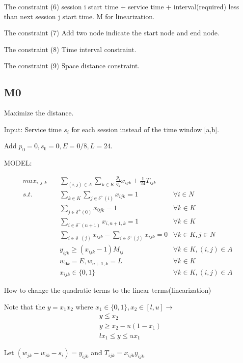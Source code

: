 The constraint (6) session i start time + service time + interval(required) less than next session j start time. M for linearization.


The constraint (7) Add two node indicate the start node and end node.

The constraint (8) Time interval constraint.

The constraint (9) Space distance constraint.


\subsection{M0}
Maximize the distance.

Input: Service time $s_i$ for each session instead of the time window [a,b].

Add $p_0 = 0, s_0 = 0, E = 0/8, L=24.$

MODEL:


\begin{align}
max_{i,j,k} \quad & \sum_{(i,j) \in A} \sum_{k \in K} \frac{p_i}{q_k} x_{ijk} + \frac{1}{24} T_{ijk} \\
s.t. \quad  & \sum_{k \in K} \sum_{j \in \delta^+ (i)} x_{ijk} =1 & \forall i \in N  \\
& \sum_{j \in \delta^+ (0)} x_{0jk} =1 & \forall k \in K \\
& \sum_{i \in \delta^- (n+1)} x_{i,n+1,k} =1 & \forall k \in K \\
& \sum_{i \in \delta^- (j)} x_{ijk} - \sum_{i \in \delta^+ (j)} x_{ijk} = 0  & \forall k \in K, j \in N \\
& y_{ijk} \geq (x_{ijk}-1) M_{ij} & \forall k \in K, (i,j) \in A \\
& w_{0k}=E, w_{n+1,k}=L  & \forall k \in K \\
& x_{ijk} \in \{0,1\} & \forall k \in K, (i,j) \in A
\end{align}

How to change the quadratic terms to the linear terms(linearization)

Note that the
$y =x_1 x_2$  where $x_1 \in \{0,1\}, x_2 \in [l,u] \to$
$$
\begin{aligned}
& y \leq x_2 \\
& y \geq x_2 - u(1-x_1)    \\
& l x_1 \leq y \leq u x_1
\end{aligned}$$

Let $(w_{jk}-w_{ik}-s_i) = y_{ijk}$ and $T_{ijk} = x_{ijk} y_{ijk}$

